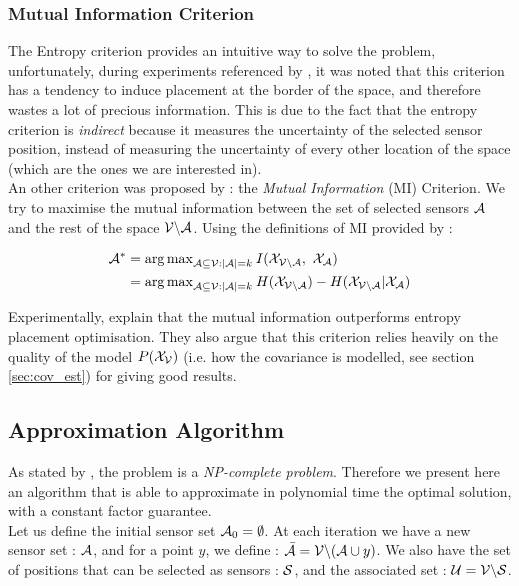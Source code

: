 \documentclass[12pt,twoside]{report}
\begin{document}
\subsubsection{Mutual Information Criterion}

The Entropy criterion provides an intuitive way to solve the problem, unfortunately, during experiments referenced by \citet{krause_near-optimal_2008}, it was noted that this criterion has a tendency to induce placement at the border of the space, and therefore wastes a lot of precious information. This is due to the fact that the entropy criterion is \textit{indirect} because it measures the uncertainty of the selected sensor position, instead of measuring the uncertainty of every other location of the space (which are the ones we are interested in). \\

An other criterion was proposed by \citet{caselton_optimal_1984} : the \textit{Mutual Information} (MI) Criterion. We try to maximise the mutual information between the set of selected sensors $\A$ and the rest of the space $\VA$. Using the definitions of MI provided by \citet[p.~19]{cover_elements_1991} : 

\begin{align}
	\A^* &= {\arg\max}_{\A \subseteq \V : |\A| = k } \: I(\X_{\VA} , \X_\A) \\
	&= {\arg\max}_{\A \subseteq \V : |\A| = k } \: H(\X_{\VA}) -  H(\X_{\VA} | \X_{\A})
\end{align}


Experimentally, \citet{krause_near-optimal_2008} explain that  the mutual information outperforms entropy placement optimisation. They also argue that this criterion relies heavily on the quality of the model $P(\X_\V)$ (i.e. how the covariance is modelled, see section \ref{sec:cov_est}) for giving good results. 

\subsection{Approximation Algorithm}
 
 As stated by \citet{krause_near-optimal_2008}, the problem is a \textit{NP-complete problem}. Therefore we present here an algorithm that is able to approximate in polynomial time the optimal solution, with a constant factor guarantee. \\
 
 Let us define the initial sensor set $\A_0 = \emptyset$. At each iteration we have a new sensor set : $\A$,  and for a point $y$, we define : $\bar{\A} = \V \backslash ( \A \cup y )$. We also have the set of positions that can be selected as sensors : $\S$,  and the associated set : $\U = \V \backslash \S $. \\
 
\end{document}
